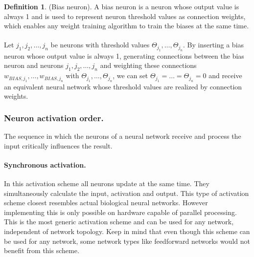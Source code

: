 \documentclass[pdftex,a4paper,12pt,twoside]{report}
\theoremstyle{plain} \newtheorem{theorem}{Theorem} \newtheorem{proposition}{Proposition} \newtheorem{lemma}{Lemma} \newtheorem*{corollary}{Corollary}
\theoremstyle{definition} \newtheorem{definition}{Definition} \newtheorem{conjecture}{Conjecture} \newtheorem*{example}{Example} \newtheorem{algorithm}{Algorithm}
\theoremstyle{remark} \newtheorem*{remark}{Remark} \newtheorem*{note}{Note} \newtheorem{case}{Case}
\begin{document}
\begin{definition}
(Bias neuron). A bias neuron is a neuron whose output value is always 1 and is used to represent neuron threshold values as connection weights, which enables any weight training algorithm to train the biases at the same time.\\\\Let $j_1,j_2, \dotsc ,j_n$ be neurons with threshold values $\Theta_{j_{1}}, \dotsc ,\Theta_{j_{n}}$. By inserting a bias neuron whose output value is always 1, generating connections between the bias neuron and neurons $j_1,j_2, \dotsc ,j_n$ and weighting these connections $w_{BIAS,j_{1}},\dotsc,w_{BIAS,j_{n}}$ with $\Theta_{j_{1}}, \dotsc ,\Theta_{j_{n}}$, we can set $\Theta_{j_{1}}= \ldots = \Theta_{j_{n}} = 0$ and receive an equivalent neural network whose threshold values are realized by connection weights.
\end{definition}
\subsubsection{Neuron activation order.}
The sequence in which the neurons of a neural network receive and process the input critically influences the result.
\paragraph{Synchronous activation.}
In this activation scheme all neurons update at the same time. They simultaneously calculate the input, activation and output. This type of activation scheme closest resembles actual biological neural networks. However implementing this is only possible on hardware capable of parallel processing. This is the most generic activation scheme and can be used for any network, independent of network topology. Keep in mind that even though this scheme can be used for any network, some network types like feedforward networks would not benefit from this scheme.
\end{document}
